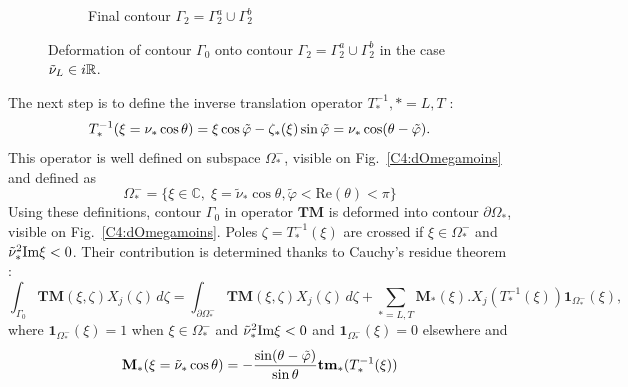 \begin{figure}
\begin{subfigure}[b]{0.45\textwidth}
	\caption{Final contour $\Gamma_2=\Gamma_2^a\cup\Gamma_2^b$}
\end{subfigure}
\caption{Deformation of contour $\Gamma_0$ onto contour $\Gamma_2=\Gamma_2^a\cup\Gamma_2^b$ in the case $\tilde{\nu}_L \in i\mathbb{R}$.}
\label{C4:contour2crit}
\end{figure}

The next step is to define the inverse translation operator $T_*^{-1}, *=L,T$ :
\begin{equation}
T_*^{-1}(\xi=\nu_*\cos\theta)=\xi \cos \tilde{\varphi}-\zeta_*(\xi)\sin\tilde{\varphi}=\nu_*\cos(\theta-\tilde{\varphi}).
\end{equation}
This operator is well defined on subspace $\Omega_*^-$, visible on Fig.~\ref{C4:dOmegamoins} and defined as 
\begin{equation}
\Omega_*^-=\{ \xi \in \mathbb{C}, \; \xi=\tilde{\nu}_* \cos \theta,  \tilde{\varphi}<\mbox{Re}(\theta)<\pi \}
\end{equation}
Using these definitions, contour $\Gamma_0$ in operator $\mathbf{TM}$ is deformed into contour $\partial \Omega_*$, visible on Fig.~\ref{C4:dOmegamoins}. Poles $\zeta=T_*^{-1}(\xi)$ are crossed if $\xi \in \Omega_*^-$ and $\tilde{\nu}_*^2 \rm Im \xi<0$. Their contribution is determined thanks to Cauchy's residue theorem :
\begin{equation}
\int_{\Gamma_0} \textbf{TM}(\xi,\zeta)X_j(\zeta)\, d\zeta = \int_{\partial \Omega_*^-}  \textbf{TM}(\xi,\zeta)X_j(\zeta)\, d\zeta+\sum_{*=L,T} \mathbf{M}_*(\xi).X_j(T^{-1}_*(\xi))\textbf{1}_{\Omega_*^-}(\xi),
\label{C4:TM2}
\end{equation}
where $\textbf{1}_{\Omega_*^-}(\xi)=1$ when $\xi \in \Omega_*^-$ and $\tilde{\nu}_*^2 \rm Im \xi<0$ and $\textbf{1}_{\Omega_*^-}(\xi)=0$ elsewhere and
\begin{equation}
\mathbf{M}_*(\xi=\tilde{\nu}_*\cos\theta)=-\frac{\sin(\theta-\tilde{\varphi})}{\sin\theta} \textbf{tm}_*(T_*^{-1}(\xi))
\end{equation}

